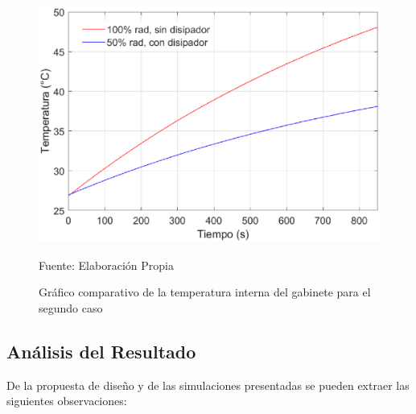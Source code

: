 \begin{figure}[H]
\centering
\includegraphics[scale=0.75]{Figuras/disipador_comparacion_2.eps}
\caption{Gráfico comparativo de la temperatura interna del gabinete para el segundo caso}
Fuente: Elaboración Propia
\label{disipador comparacion2}
\end{figure}

\subsection{Análisis del Resultado}

De la propuesta de diseño y de las simulaciones presentadas se pueden extraer las siguientes observaciones:

